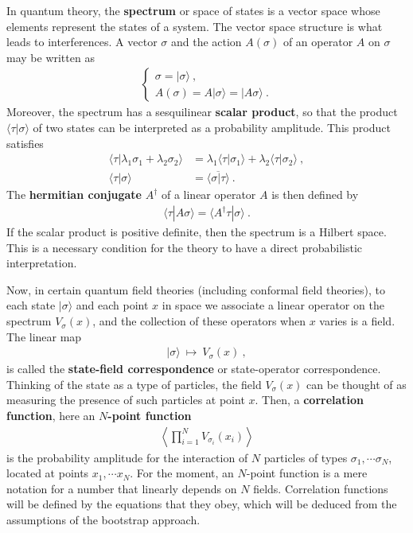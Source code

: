 \documentclass[12pt, a4paper, notitlepage, twoside]{report}
\numberwithin{equation}{section}
\theoremstyle{break}
\begin{document}
In quantum theory, the \textbf{\boldmath spectrum} or space of states is a vector space whose elements represent the states of a system.
The vector space structure is what leads to interferences.
A vector $\sigma$ and the action $A(\sigma)$ of an operator $A$ on $\sigma$ may be written as 
\begin{align}
\left\{\begin{array}{l} 
 \sigma = |\sigma\rangle\ , \\ A(\sigma) = A|\sigma\rangle = |A\sigma\rangle\ .
\end{array}\right. 
\end{align}
Moreover, the spectrum has a sesquilinear \textbf{\boldmath scalar product}, so that the product $\langle \tau|\sigma \rangle$ of two states can be interpreted as a probability amplitude.
This product satisfies
\begin{align}
\langle \tau| \lambda_1\sigma_1+\lambda_2\sigma_2\rangle &= \lambda_1 \langle \tau|\sigma_1\rangle + \lambda_2\langle \tau|\sigma_2\rangle\ ,
\\
\langle \tau|\sigma \rangle &= \overline{\langle \sigma|\tau\rangle}\ .
\end{align}
The \textbf{\boldmath hermitian conjugate} $A^\dagger$ of a linear operator $A$ is then defined by
\begin{align}
 \langle \tau | A \sigma\rangle = \langle A^\dagger \tau | \sigma\rangle\ .
\label{lld}
\end{align}
If the scalar product is positive definite, then the spectrum is a Hilbert space.
This is a necessary condition for the theory to have a direct probabilistic interpretation.

Now, in certain quantum field theories (including conformal field theories), to each state $|\sigma\rangle$ and each point $x$ in space we associate a linear operator on the spectrum $V_\sigma(x)$, and the collection of these operators when $x$ varies is a field. 
The linear map 
\begin{align}
 |\sigma \rangle  \ \mapsto \ V_\sigma(x)\ ,
\end{align}
is called the \textbf{\boldmath state-field correspondence} or state-operator correspondence.
Thinking of the state as a type of particles, the field $V_\sigma(x)$ can be thought of as measuring the presence of such particles at point $x$.
Then, a \textbf{\boldmath correlation function}, here an \textbf{\boldmath $N$-point function}
\begin{align}
\left\langle \prod_{i=1}^N V_{\sigma_i}(x_i)\right\rangle
\label{pva}
\end{align}
is the probability amplitude for the interaction of $N$ particles of types $\sigma_1,\cdots \sigma_N$, located at points $x_1,\cdots x_N$. 
For the moment, an $N$-point function is a mere notation for a number that linearly depends on $N$ fields. 
Correlation functions will be defined by the equations that they obey, which will be deduced from the assumptions of the bootstrap approach.
\end{document}

